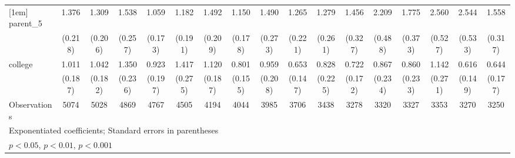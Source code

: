 {\begin{tabular}{l*{16}{c}}
[1em]
parent\_5            &       1.376\sym{*}  &       1.309         &       1.538\sym{**} &       1.059         &       1.182         &       1.492\sym{**} &       1.150         &       1.490\sym{*}  &       1.265         &       1.279         &       1.456         &       2.209\sym{***}&       1.775\sym{**} &       2.560\sym{***}&       2.544\sym{***}&       1.558\sym{*}  \\
                    &     (0.218)         &     (0.206)         &     (0.257)         &     (0.173)         &     (0.191)         &     (0.209)         &     (0.178)         &     (0.273)         &     (0.221)         &     (0.261)         &     (0.327)         &     (0.488)         &     (0.373)         &     (0.527)         &     (0.533)         &     (0.317)         \\
[1em]
college             &       1.011         &       1.042         &       1.350         &       0.923         &       1.417         &       1.120         &       0.801         &       0.959         &       0.653         &       0.828         &       0.722         &       0.867         &       0.860         &       1.142         &       0.616\sym{*}  &       0.644         \\
                    &     (0.187)         &     (0.182)         &     (0.236)         &     (0.197)         &     (0.275)         &     (0.187)         &     (0.155)         &     (0.208)         &     (0.147)         &     (0.225)         &     (0.172)         &     (0.234)         &     (0.233)         &     (0.271)         &     (0.149)         &     (0.177)         \\
\hline
Observations        &        5074         &        5028         &        4869         &        4767         &        4505         &        4194         &        4044         &        3985         &        3706         &        3438         &        3278         &        3320         &        3327         &        3353         &        3270         &        3250         \\
\hline\hline
\multicolumn{17}{l}{\footnotesize Exponentiated coefficients; Standard errors in parentheses}\\
\multicolumn{17}{l}{\footnotesize \sym{*} \(p<0.05\), \sym{**} \(p<0.01\), \sym{***} \(p<0.001\)}\\
\end{tabular}
}
